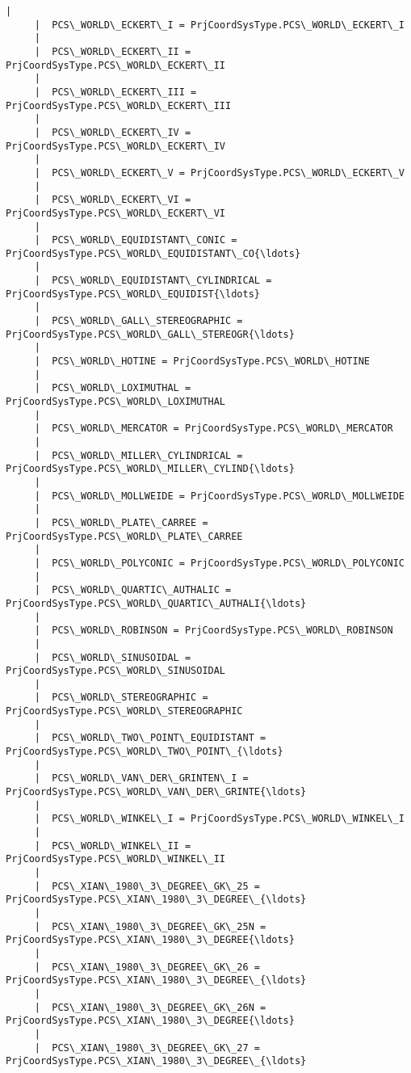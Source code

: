 \documentclass[11pt]{article}
\begin{document}
\begin{Verbatim}[commandchars=\\\{\}]
     |  
     |  PCS\_WORLD\_ECKERT\_I = PrjCoordSysType.PCS\_WORLD\_ECKERT\_I
     |  
     |  PCS\_WORLD\_ECKERT\_II = PrjCoordSysType.PCS\_WORLD\_ECKERT\_II
     |  
     |  PCS\_WORLD\_ECKERT\_III = PrjCoordSysType.PCS\_WORLD\_ECKERT\_III
     |  
     |  PCS\_WORLD\_ECKERT\_IV = PrjCoordSysType.PCS\_WORLD\_ECKERT\_IV
     |  
     |  PCS\_WORLD\_ECKERT\_V = PrjCoordSysType.PCS\_WORLD\_ECKERT\_V
     |  
     |  PCS\_WORLD\_ECKERT\_VI = PrjCoordSysType.PCS\_WORLD\_ECKERT\_VI
     |  
     |  PCS\_WORLD\_EQUIDISTANT\_CONIC = PrjCoordSysType.PCS\_WORLD\_EQUIDISTANT\_CO{\ldots}
     |  
     |  PCS\_WORLD\_EQUIDISTANT\_CYLINDRICAL = PrjCoordSysType.PCS\_WORLD\_EQUIDIST{\ldots}
     |  
     |  PCS\_WORLD\_GALL\_STEREOGRAPHIC = PrjCoordSysType.PCS\_WORLD\_GALL\_STEREOGR{\ldots}
     |  
     |  PCS\_WORLD\_HOTINE = PrjCoordSysType.PCS\_WORLD\_HOTINE
     |  
     |  PCS\_WORLD\_LOXIMUTHAL = PrjCoordSysType.PCS\_WORLD\_LOXIMUTHAL
     |  
     |  PCS\_WORLD\_MERCATOR = PrjCoordSysType.PCS\_WORLD\_MERCATOR
     |  
     |  PCS\_WORLD\_MILLER\_CYLINDRICAL = PrjCoordSysType.PCS\_WORLD\_MILLER\_CYLIND{\ldots}
     |  
     |  PCS\_WORLD\_MOLLWEIDE = PrjCoordSysType.PCS\_WORLD\_MOLLWEIDE
     |  
     |  PCS\_WORLD\_PLATE\_CARREE = PrjCoordSysType.PCS\_WORLD\_PLATE\_CARREE
     |  
     |  PCS\_WORLD\_POLYCONIC = PrjCoordSysType.PCS\_WORLD\_POLYCONIC
     |  
     |  PCS\_WORLD\_QUARTIC\_AUTHALIC = PrjCoordSysType.PCS\_WORLD\_QUARTIC\_AUTHALI{\ldots}
     |  
     |  PCS\_WORLD\_ROBINSON = PrjCoordSysType.PCS\_WORLD\_ROBINSON
     |  
     |  PCS\_WORLD\_SINUSOIDAL = PrjCoordSysType.PCS\_WORLD\_SINUSOIDAL
     |  
     |  PCS\_WORLD\_STEREOGRAPHIC = PrjCoordSysType.PCS\_WORLD\_STEREOGRAPHIC
     |  
     |  PCS\_WORLD\_TWO\_POINT\_EQUIDISTANT = PrjCoordSysType.PCS\_WORLD\_TWO\_POINT\_{\ldots}
     |  
     |  PCS\_WORLD\_VAN\_DER\_GRINTEN\_I = PrjCoordSysType.PCS\_WORLD\_VAN\_DER\_GRINTE{\ldots}
     |  
     |  PCS\_WORLD\_WINKEL\_I = PrjCoordSysType.PCS\_WORLD\_WINKEL\_I
     |  
     |  PCS\_WORLD\_WINKEL\_II = PrjCoordSysType.PCS\_WORLD\_WINKEL\_II
     |  
     |  PCS\_XIAN\_1980\_3\_DEGREE\_GK\_25 = PrjCoordSysType.PCS\_XIAN\_1980\_3\_DEGREE\_{\ldots}
     |  
     |  PCS\_XIAN\_1980\_3\_DEGREE\_GK\_25N = PrjCoordSysType.PCS\_XIAN\_1980\_3\_DEGREE{\ldots}
     |  
     |  PCS\_XIAN\_1980\_3\_DEGREE\_GK\_26 = PrjCoordSysType.PCS\_XIAN\_1980\_3\_DEGREE\_{\ldots}
     |  
     |  PCS\_XIAN\_1980\_3\_DEGREE\_GK\_26N = PrjCoordSysType.PCS\_XIAN\_1980\_3\_DEGREE{\ldots}
     |  
     |  PCS\_XIAN\_1980\_3\_DEGREE\_GK\_27 = PrjCoordSysType.PCS\_XIAN\_1980\_3\_DEGREE\_{\ldots}

\end{Verbatim}
\end{document}
